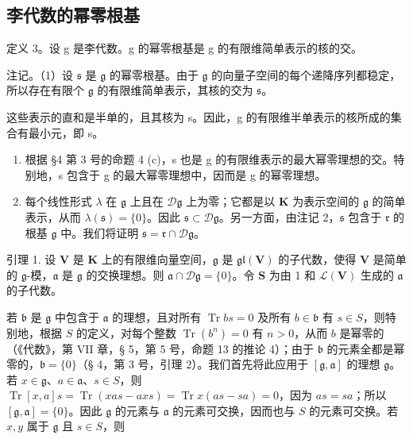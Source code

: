 \subsection{李代数的幂零根基}

定义 3。设 g 是李代数。g 的幂零根基是 g 的有限维简单表示的核的交。

注记。（1）设 \(\mathfrak{s}\) 是 \(\mathfrak{g}\) 的幂零根基。由于 \(\mathfrak{g}\) 的向量子空间的每个递降序列都稳定，所以存在有限个 \(\mathfrak{g}\) 的有限维简单表示，其核的交为 \(\mathfrak{s}\)。

这些表示的直和是半单的，且其核为 s。因此，g 的有限维半单表示的核所成的集合有最小元，即 s。

\begin{enumerate}
\def\labelenumi{(\arabic{enumi})}
\setcounter{enumi}{1}
\item
  根据 §4 第 3 号的命题 4 (c)，s 也是 g 的有限维表示的最大幂零理想的交。特别地，s 包含于 g 的最大幂零理想中，因而是 g 的幂零理想。
\item
  每个线性形式 \(\lambda\) 在 \(\mathfrak{g}\) 上且在 \(\mathcal{D}\mathfrak{g}\) 上为零；它都是以 \(\mathbf{K}\) 为表示空间的 \(\mathfrak{g}\) 的简单表示，从而 \(\lambda (\mathfrak{s}) = \{0\}\)。因此 \(\mathfrak{s} \subset \mathcal{D}\mathfrak{g}\)。另一方面，由注记 2，\(\mathfrak{s}\) 包含于 \(\mathfrak{r}\) 的根基 \(\mathfrak{g}\) 中。我们将证明 \(\mathfrak{s} = \mathfrak{r} \cap \mathcal{D}\mathfrak{g}\)。
\end{enumerate}

引理 1. 设 \(\mathbf{V}\) 是 \(\mathbf{K}\) 上的有限维向量空间，\(\mathfrak{g}\) 是 \(\mathfrak{gl}(\mathbf{V})\) 的子代数，使得 \(\mathbf{V}\) 是简单的 \(\mathfrak{g}\)-模，\(\mathfrak{a}\) 是 \(\mathfrak{g}\) 的交换理想。则 \(\mathfrak{a} \cap \mathcal{D}\mathfrak{g} = \{0\}\)。令 \(\mathbf{S}\) 为由 1 和 \(\mathcal{L}(\mathbf{V})\) 生成的 \(\mathfrak{a}\) 的子代数。

若 \(\mathfrak{b}\) 是 \(\mathfrak{g}\) 中包含于 \(\mathfrak{a}\) 的理想，且对所有 \(\operatorname{Tr}bs = 0\) 及所有 \(b\in \mathfrak{b}\) 有 \(s\in S\)，则特别地，根据 \(S\) 的定义，对每个整数 \(\operatorname{Tr}(b^n) = 0\) 有 \(n > 0\)，从而 \(b\) 是幂零的（《代数》，第 VII 章，§ 5，第 5 号，命题 13 的推论 4）；由于 \(\mathfrak{b}\) 的元素全都是幂零的，\(\mathfrak{b} = \{0\}\)（§ 4，第 3 号，引理 2）。我们首先将此应用于 \([\mathfrak{g},\mathfrak{a}]\) 的理想 \(\mathfrak{g}\)。若 \(x\in \mathfrak{g}\)、\(a\in \mathfrak{a}\)、\(s\in S\)，则 \(\operatorname{Tr}[x,a]s = \operatorname{Tr}(xas - axs) = \operatorname{Tr}x(as - sa) = 0\)，因为 \(as = sa\)；所以 \([\mathfrak{g},\mathfrak{a}] = \{0\}\)。因此 \(\mathfrak{g}\) 的元素与 \(\mathfrak{a}\) 的元素可交换，因而也与 \(S\) 的元素可交换。若 \(x,y\) 属于 \(\mathfrak{g}\) 且 \(s\in S\)，则

